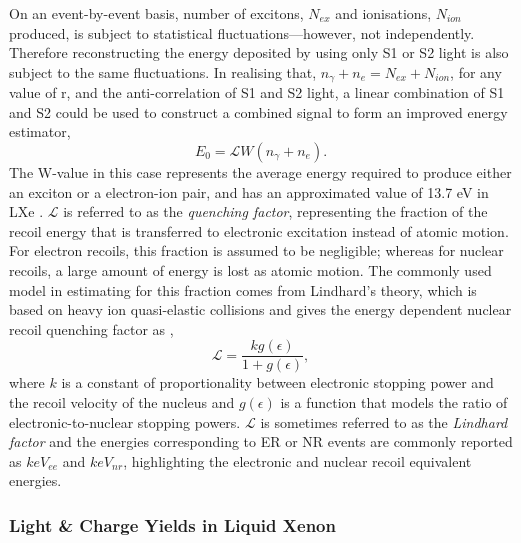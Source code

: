 On an event-by-event basis, number of excitons, $N_{ex}$ and ionisations, $N_{ion}$ produced, is subject to statistical fluctuations---however, not independently. Therefore reconstructing the energy deposited by using only S1 or S2 light is also subject to the same fluctuations. In realising that, $ n_{\gamma} + n_{e} = N_{ex} + N_{ion}$, for any value of r, and the anti-correlation of S1 and S2 light, a linear combination of S1 and S2 could be used to construct a combined signal to form an improved energy estimator,
%
\begin{equation} \label{eq:combined_energy}
    E_{0} = \mathcal{L}W(n_{\gamma} + n_{e}). 
\end{equation}
%
The W-value in this case represents the average energy required to produce either an exciton or a electron-ion pair, and has an approximated value of 13.7 eV in LXe \cite{Dahl}. $\mathcal{L}$ is referred to as the \textit{quenching factor}, representing the fraction of the recoil energy that is transferred to electronic excitation instead of atomic motion. For electron recoils, this fraction is assumed to be negligible; whereas for nuclear recoils, a large amount of energy is lost as atomic motion. The commonly used model in estimating for this fraction comes from Lindhard’s theory, which is based on heavy ion quasi-elastic collisions and gives the energy dependent nuclear recoil quenching factor as \cite{Lindhard, Lindhard_2},
%
\begin{equation} \label{eq:combined_energy}
    \mathcal{L} = \frac{kg(\epsilon)}{1 + g(\epsilon)},
\end{equation}
%
where $k$ is a constant of proportionality between electronic stopping power and the recoil velocity of the nucleus and $g(\epsilon)$ is a function that models the ratio of electronic-to-nuclear stopping powers. $\mathcal{L}$ is sometimes referred to as the \textit{Lindhard factor} and the energies corresponding to ER or NR events are commonly reported as $keV_{ee}$ and $keV_{nr}$, highlighting the electronic and nuclear recoil equivalent energies.

\subsubsection{Light \& Charge Yields in Liquid Xenon}
\label{subsubsec:light_charge}

